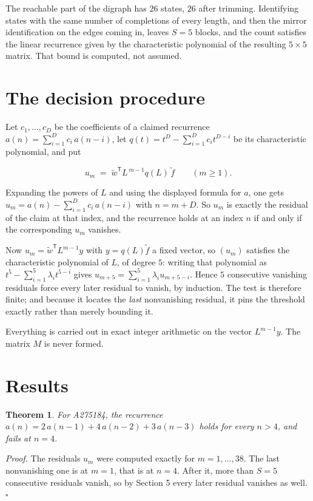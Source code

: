\documentclass[11pt]{article}
\newtheorem{theorem}{Theorem}
\theoremstyle{definition}
\begin{document}
The reachable part of the digraph has $26$ states, $26$ after trimming. Identifying states with the same number of completions of every length, and then the mirror identification on the edges coming in, leaves $S = 5$ blocks, and the count satisfies the linear recurrence given by the characteristic polynomial of the resulting $5\times5$ matrix. That bound is computed, not assumed.

\section{The decision procedure}

Let $c_1,\dots,c_D$ be the coefficients of a claimed recurrence $a(n) = \sum_{i=1}^{D} c_i\,a(n-i)$, let $q(t) = t^{D} - \sum_{i=1}^{D} c_i t^{D-i}$ be its characteristic polynomial, and put

\[u_m \;=\; \tilde w^{\mathsf T} L^{\,m-1} q(L)\,\tilde f \qquad (m \ge 1).\]

Expanding the powers of $L$ and using the displayed formula for $a$, one gets $u_m = a(n) - \sum_{i=1}^{D} c_i\,a(n-i)$ with $n = m + D$. So $u_m$ is exactly the residual of the claim at that index, and the recurrence holds at an index $n$ if and only if the corresponding $u_m$ vanishes.

Now $u_m = \tilde w^{\mathsf T} L^{m-1} y$ with $y = q(L)\tilde f$ a fixed vector, so $(u_m)$ satisfies the characteristic polynomial of $L$, of degree $5$: writing that polynomial as $t^{5} - \sum_{i=1}^{5} \lambda_i t^{5-i}$ gives $u_{m+5} = \sum_{i=1}^{5} \lambda_i u_{m+5-i}$. Hence $5$ consecutive vanishing residuals force every later residual to vanish, by induction. The test is therefore finite; and because it locates the {\itshape last} nonvanishing residual, it pins the threshold exactly rather than merely bounding it.

Everything is carried out in exact integer arithmetic on the vector $L^{m-1}y$. The matrix $M$ is never formed.

\section{Results}

\begin{theorem} For A275184, the recurrence $a(n) = 2\,a(n-1) + 4\,a(n-2) + 3\,a(n-3)$ holds for every $n > 4$, and fails at $n = 4$.\end{theorem}

{\itshape Proof.} The residuals $u_m$ were computed exactly for $m = 1,\dots,38$. The last nonvanishing one is at $m = 1$, that is at $n = 4$. After it, more than $S = 5$ consecutive residuals vanish, so by Section 5 every later residual vanishes as well. $\square$
\end{document}
